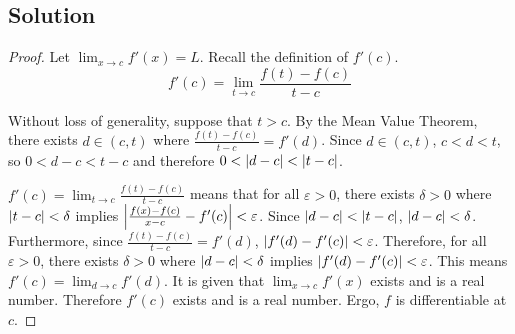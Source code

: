 \documentclass[11pt]{article}
\begin{document}
    \subsection{Solution}
        \begin{proof}
            Let $\lim_{x \to c} f'(x) = L$.
            Recall the definition of $f'(c)$.
            \begin{equation}
                f'(c) = \lim_{t \to c}\frac{f(t) - f(c)}{t - c}
            \end{equation}

            Without loss of generality, suppose that $t > c$.
            By the Mean Value Theorem, there exists $d \in (c,t)$ where $\frac{f(t) - f(c)}{t - c} = f'(d)$.
            Since $d \in (c,t)$, $c < d < t$, so $0 < d - c < t - c$ and therefore $0 < \left| d - c \right| < \left| t - c \right|$.

            $f'(c) = \lim_{t \to c}\frac{f(t) - f(c)}{t - c}$ means that for all $\varepsilon > 0$, there exists $\delta > 0$ where $\left| t - c \right| < \delta$ implies $\left| \frac{f(x) - f(c)}{x - c} - f'(c) \right| < \varepsilon$.
            Since $\left| d - c \right| < \left| t - c \right|$, $\left| d - c \right| < \delta$.
            Furthermore, since $\frac{f(t) - f(c)}{t - c} = f'(d)$, $\left| f'(d) - f'(c) \right| < \varepsilon$.
            Therefore, for all $\varepsilon > 0$, there exists $\delta > 0$ where $\left| d - c \right| < \delta$ implies $\left| f'(d) - f'(c) \right| < \varepsilon$.
            This means $f'(c) = \lim_{d \to c} f'(d)$.
            It is given that $\lim_{x \to c} f'(x)$ exists and is a real number.
            Therefore $f'(c)$ exists and is a real number.
            Ergo, $f$ is differentiable at $c$.
        \end{proof}

\pagebreak
\end{document}
